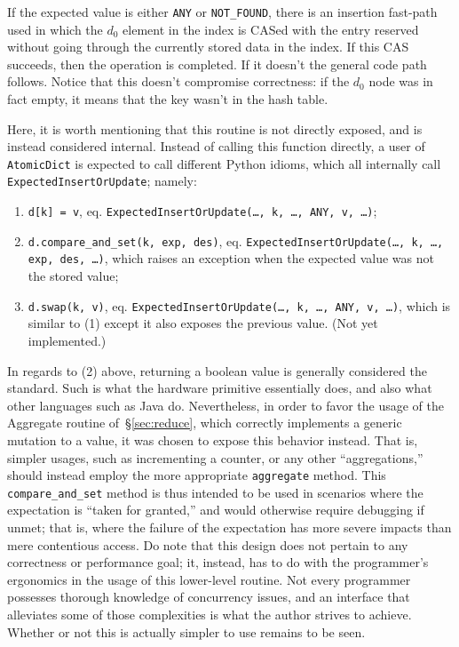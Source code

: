 If the expected value is either \texttt{{ANY}} or \texttt{{NOT\_FOUND}}, there is an insertion fast-path used in which the $d_0$ element in the index is CASed with the entry reserved without going through the currently stored data in the index.
If this CAS succeeds, then the operation is completed.
If it doesn't the general code path follows.
Notice that this doesn't compromise correctness: if the $d_0$ node was in fact empty, it means that the key wasn't in the hash table.

Here, it is worth mentioning that this routine is not directly exposed, and is instead considered internal.
Instead of calling this function directly, a user of \texttt{AtomicDict} is expected to call different Python idioms, which all internally call \texttt{ExpectedInsertOrUpdate}; namely:

\begin{enumerate}
    \item \texttt{{d[k] = v}}, eq. \texttt{{ExpectedInsertOrUpdate(\ldots, k, \ldots, ANY, v, \ldots)}};
    \item \texttt{{d.compare\_and\_set(k, exp, des)}}, eq. \texttt{{ExpectedInsertOrUpdate(\ldots, k, \ldots, exp, des, \ldots)}}, which raises an exception when the expected value was not the stored value;
    \item \texttt{{d.swap(k, v)}}, eq. \texttt{{ExpectedInsertOrUpdate(\ldots, k, \ldots, ANY, v, \ldots)}}, which is similar to (1) except it also exposes the previous value.
    (Not yet implemented.)
\end{enumerate}

In regards to (2) above, returning a boolean value is generally considered the standard.
Such is what the hardware primitive essentially does, and also what other languages such as Java do.
Nevertheless, in order to favor the usage of the Aggregate routine of~\S\ref{sec:reduce}, which correctly implements a generic mutation to a value, it was chosen to expose this behavior instead.
That is, simpler usages, such as incrementing a counter, or any other ``aggregations,'' should instead employ the more appropriate \texttt{aggregate} method.
This \texttt{compare\_and\_set} method is thus intended to be used in scenarios where the expectation is ``taken for granted,'' and would otherwise require debugging if unmet; that is, where the failure of the expectation has more severe impacts than mere contentious access.
Do note that this design does not pertain to any correctness or performance goal; it, instead, has to do with the programmer's ergonomics in the usage of this lower-level routine.
Not every programmer possesses thorough knowledge of concurrency issues, and an interface that alleviates some of those complexities is what the author strives to achieve.
Whether or not this is actually simpler to use remains to be seen.

